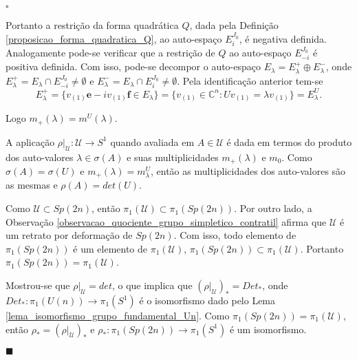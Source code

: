 \documentclass[12pt]{book}
\newenvironment{prova}[1]{$\square$ #1}{\hfill$\blacksquare$}
\newcommand{\autoespaco}[1]{E_{#1}}
\newcommand{\circulo}{S^{1}}
\newcommand{\complexo}[1]{\mathbb{C}^{#1}}
\newcommand{\espectrooperador}[1]{\sigma(#1)}
\newcommand{\estruturacomplexa}{J_{0}}
\newcommand{\grupofundamental}[1]{\pi_{1}(#1)}
\newcommand{\gruposimpletico}[1]{Sp(#1)}
\newcommand{\matrizSimpleticaOrtogonal}{\mathcal{U}}
\newcommand{\matrizunitaria}[1]{U(#1)}
\begin{document}
\begin{prova}
\begin{enumerate}
			Portanto a restrição da forma quadrática $Q$, dada pela Definição \ref{proposicao_forma_quadratica_Q}, ao auto-espaço $\autoespaco{ i}^{\estruturacomplexa}$, é negativa definida. Analogamente pode-se verificar que a restrição de $Q$ ao auto-espaço $\autoespaco{ -i}^{\estruturacomplexa}$ é positiva definida. Com isso, pode-se decompor o auto-espaço $\autoespaco{\lambda} = \autoespaco{\lambda}^{+} \oplus \autoespaco{\lambda}^{-}$, onde $\autoespaco{\lambda}^{+} = \autoespaco{\lambda}\cap \autoespaco{- i}^{\estruturacomplexa} \neq \emptyset$ e $\autoespaco{\lambda}^{-} = \autoespaco{\lambda}\cap \autoespaco{ i}^{\estruturacomplexa} \neq \emptyset$. Pela identificação anterior tem-se
			$$
			\autoespaco{\lambda}^{+}=\{v_{(1)}\textbf{e}-iv_{(1)}\textbf{f}\in \autoespaco{\lambda}\} = \{v_{(1)} \in \complexo{n} : Uv_{(1)}=\lambda v_{(1)} \} = \autoespaco{\lambda}^{U}.
			$$
			
			Logo $m_{+}(\lambda) = m^{U}(\lambda)$.
			
			A aplicação $\rho|_{\mathcal{U}}: \mathcal{U} \to \circulo$ quando avaliada em $A\in \mathcal{U}$ é dada em termos do produto dos auto-valores $\lambda \in \espectrooperador{A}$ e suas multiplicidades $m_{+}(\lambda)$ e $m_{0}$. Como $\espectrooperador{A} = \espectrooperador{U}$ e $m_{+}(\lambda)  = m_{\lambda}^{U}$, então as multiplicidades dos auto-valores são as mesmas e $\rho(A)=det(U)$.

			Como $\matrizSimpleticaOrtogonal \subset \gruposimpletico{2n}$, então $\grupofundamental{\matrizSimpleticaOrtogonal} \subset \grupofundamental{\gruposimpletico{2n}}$. Por outro lado, a Observação \ref{observacao_quociente_grupo_simpletico_contratil} afirma que $\matrizSimpleticaOrtogonal$ é um retrato por deformação de $\gruposimpletico{2n}$. Com isso, todo elemento de $\grupofundamental{\gruposimpletico{2n}} $ é um elemento de $\grupofundamental{\matrizSimpleticaOrtogonal}$, $\grupofundamental{\gruposimpletico{2n}}\subset\grupofundamental{\matrizSimpleticaOrtogonal}$. Portanto $\grupofundamental{\gruposimpletico{2n}}=\grupofundamental{\matrizSimpleticaOrtogonal}$.
			
			Mostrou-se que $\rho|_{\matrizSimpleticaOrtogonal} =det$, o que implica que $(\rho|_{\matrizSimpleticaOrtogonal})_{*} = Det_{*}$, onde $Det_{*}:\grupofundamental{\matrizunitaria{n}} \to \grupofundamental{\circulo}$ é o isomorfismo dado pelo Lema \ref{lema_isomorfismo_grupo_fundamental_Un}. Como $\grupofundamental{\gruposimpletico{2n}}=\grupofundamental{\matrizSimpleticaOrtogonal}$, então $\rho_{*}=(\rho|_{\matrizSimpleticaOrtogonal})_{*}$ e $\rho_{*}: \grupofundamental{\gruposimpletico{2n}} \to \grupofundamental{\circulo}$ é um isomorfismo.
			

\end{enumerate}
\end{prova}
\end{document}
